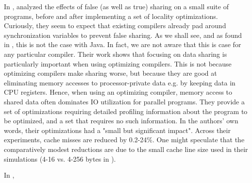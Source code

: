 In \citeyear{TorrellasShared}, \citeauthor{TorrellasShared}
\cite{TorrellasShared} analyzed the effects of false (as well as true) sharing
on a small suite of programs, before and after implementing a set of locality
optimizations. Curiously, they seem to expect that existing compilers already
pad around synchronization variables to prevent false sharing. As we shall see,
and as found in \cite{mystery}, this is not the case with Java. In fact, we are
not aware that this is case for any particular compiler.
Their work shows that focusing on data sharing is particularly important when
using optimizing compilers. This is not because optimizing compilers make
sharing worse, but because they are good at eliminating memory accesses to
processor-private data e.g. by keeping data in CPU registers. Hence, when
using an optimizing compiler, memory access to shared data often dominates IO
utilization for parallel programs. They provide a set of optimizations
requiring detailed profiling information about the program to be optimized, and
a set that requires no such information. In the authors' own words, their
optimizations had a "small but significant impact". Across their experiments,
cache misses are reduced by 0.2-24\%. One might speculate that the comparatively
modest reductions are due to the small cache line size used in their simulations
(4-16 vs. 4-256 bytes in \cite{EggersReducing}).

In \citeyear{falsedef},
\citeauthor{falsedef} \cite{falsedef}



